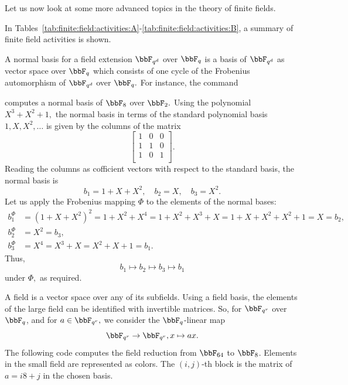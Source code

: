 Let us now look at some more advanced topics in the theory of finite fields. 


\bigskip


In Tables~\ref{tab:finite:field:activities:A}-\ref{tab:finite:field:activities:B}, 
a summary of 
finite field activities is shown.
		

\bigskip




A normal basis for a field extension $\bbF_{q^d}$ over $\bbF_q$ 
is a basis of $\bbF_{q^d}$ as vector space over $\bbF_q$ 
which consists of one cycle of the Frobenius 
automorphism of $\bbF_{q^d}$ over $\bbF_q.$
For instance, the command


computes a normal basis of $\bbF_8$ over $\bbF_2.$
Using the polynomial $X^{3} + X^{2} + 1,$
the normal basis in terms of the 
standard polynomial basis $1,X,X^2,\ldots$ 
is given by the columns of the matrix 
$$
\left[
\begin{array}{ccc}
1 &0 &0\\ 
1 &1 &0 \\
1 &0 &1 \\
\end{array}
\right].
$$
Reading the columns as cofficient 
vectors with respect to the standard basis, 
the normal basis is 
$$
b_1 = 1 + X + X^2, \quad b_2 = X, \quad b_3 = X^2.
$$
Let us apply the Frobenius mapping $\Phi$ 
to the elements of the normal bases:
\begin{align*}
b_1^\Phi &= (1+X+X^2)^2 = 1 + X^2 + X^4 = 1 + X^2 + X^3 + X = 1 + X + X^2 + X^2 + 1 = X = b_2,\\
b_2^\Phi &= X^2 = b_3, \\
b_3^\Phi &= X^4 = X^3+X = X^2+X+1 = b_1.
\end{align*}
Thus,
$$
b_1 \mapsto b_2 \mapsto b_3 \mapsto b_1
$$ 
under $\Phi,$ as required.

\bigskip

A field is a vector space over any of its subfields. 
Using a field basis, the elements of the large field can be 
identified with invertible matrices. 
So, for $\bbF_{q^r}$ over $\bbF_q$, and for $a \in \bbF_{q^r},$ 
we consider the $\bbF_q$-linear map 
$$
\bbF_{q^r} \rightarrow \bbF_{q^r} , x \mapsto ax.
$$
The following code computes the field reduction from $\bbF_{64}$ to $\bbF_8$. 
Elements in the small field are represented as colors.
The $(i,j)$-th block is the matrix of $a=i8+j$ in the chosen basis.

